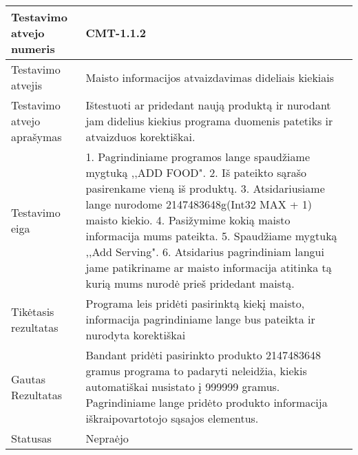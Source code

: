 \documentclass[oneside]{VUMIFPSkursinis}
\begin{document}
\begin{center}
    \begin{tabular}{ |p{5cm}|p{13cm}|}
    \hline
    	Testavimo atvejo numeris & CMT-1.1.2  \\ \hline
    	Testavimo atvejis & Maisto informacijos atvaizdavimas dideliais kiekiais  \\ \hline
	Testavimo atvejo aprašymas & Ištestuoti ar pridedant naują produktą ir nurodant jam didelius kiekius programa duomenis patetiks ir atvaizduos korektiškai.  \\ \hline
	Testavimo eiga & 1. Pagrindiniame programos lange spaudžiame mygtuką ,,ADD FOOD". 
				2. Iš pateikto sąrašo pasirenkame vieną iš produktų. 
				3. Atsidariusiame lange nurodome 2147483648g(Int32 MAX + 1) maisto kiekio.
				4. Pasižymime kokią maisto informacija mums pateikta.
				5. Spaudžiame mygtuką ,,Add Serving".
				6. Atsidarius pagrindiniam langui jame patikriname ar maisto informacija atitinka tą kurią mums nurodė prieš pridedant maistą.\\ \hline
	Tikėtasis rezultatas & Programa leis pridėti pasirinktą kiekį maisto, informacija pagrindiniame lange bus pateikta ir nurodyta korektiškai  \\ \hline
	Gautas Rezultatas & Bandant pridėti pasirinkto produkto 2147483648 gramus programa to padaryti neleidžia, kiekis automatiškai nusistato į 999999 gramus. Pagrindiniame lange pridėto produkto informacija iškraipovartotojo sąsajos elementus.  \\ \hline
	Statusas & Nepraėjo  \\ \hline
    \hline
    \end{tabular}
\end{center}
\end{document}
